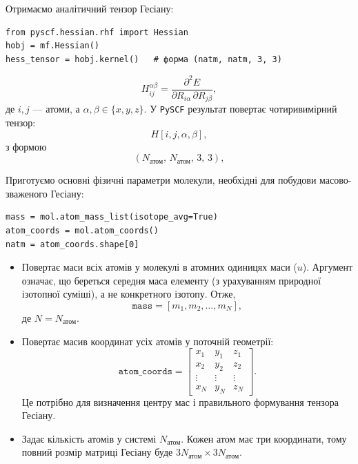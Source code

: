 Отримаємо аналітичний тензор Гесіану:

\begin{verbatim}
from pyscf.hessian.rhf import Hessian
hobj = mf.Hessian()
hess_tensor = hobj.kernel()   # форма (natm, natm, 3, 3)
\end{verbatim}

\[
    H_{ij}^{\alpha\beta} =
    \frac{\partial^2 E}{\partial R_{i\alpha}\, \partial R_{j\beta}},
\]
де $i,j$ --- атоми, а $\alpha,\beta \in \{x,y,z\}$. У \texttt{PySCF} результат  повертає чотиривимірний тензор:
\[
    H[i, j, \alpha, \beta],
\]
з формою
\[
    (N_{\text{атом}},\, N_{\text{атом}},\, 3,\, 3),
\]

Приготуємо основні фізичні параметри молекули, необхідні
для побудови масово-зваженого Гесіану:

\begin{verbatim}
mass = mol.atom_mass_list(isotope_avg=True)
atom_coords = mol.atom_coords()
natm = atom_coords.shape[0]
\end{verbatim}

\begin{itemize}
\item {}
   Повертає маси всіх атомів у молекулі в атомних одиницях маси (\(u\)).
   Аргумент  означає, що береться середня маса елементу
   (з урахуванням природної ізотопної суміші), а не конкретного ізотопу.
   Отже,
   \[
       \texttt{mass} = [m_1, m_2, \ldots, m_N],
   \]
   де \(N = N_\text{атом}\).

\item  {}
   Повертає масив координат усіх атомів у поточній геометрії:
   \[
       \texttt{atom\_coords} =
       \begin{bmatrix}
       x_1 & y_1 & z_1 \\
       x_2 & y_2 & z_2 \\
       \vdots & \vdots & \vdots \\
       x_N & y_N & z_N
       \end{bmatrix}.
   \]
   Це потрібно для визначення центру мас і правильного формування тензора Гесіану.

\item  {}
   Задає кількість атомів у системі \(N_\text{атом}\).
   Кожен атом має три координати, тому повний розмір матриці Гесіану буде
   \(3N_\text{атом} \times 3N_\text{атом}\).
\end{itemize}

